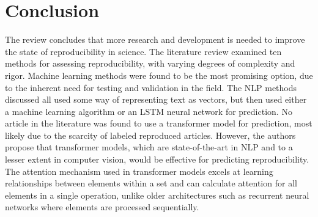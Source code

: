 \documentclass[12pt, a4paper, twocolumn]{article}
\begin{document}
% 


	\section{Conclusion} \label{sec:conclusion}
The review concludes that more research and development is needed to improve the state of reproducibility in science. The literature review examined ten methods for assessing reproducibility, with varying degrees of complexity and rigor. Machine learning methods were found to be the most promising option, due to the inherent need for testing and validation in the field. The NLP methods discussed all used some way of representing text as vectors, but then used either a machine learning algorithm or an LSTM neural network for prediction. No article in the literature was found to use a transformer model for prediction, most likely due to the scarcity of labeled reproduced articles. However, the authors propose that transformer models, which are state-of-the-art in NLP and to a lesser extent in computer vision, would be effective for predicting reproducibility. The attention mechanism used in transformer models excels at learning relationships between elements within a set and can calculate attention for all elements in a single operation, unlike older architectures such as recurrent neural networks where elements are processed sequentially.
\end{document}
